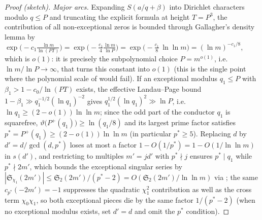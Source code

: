 \documentclass[11pt]{article}
\theoremstyle{plain}
\theoremstyle{definition}
\begin{document}
\begin{proof}[Proof (sketch)]
\emph{Major arcs.} Expanding $S(a/q + \beta)$ into Dirichlet
characters modulo $q \le P$ and truncating the explicit formula at
height $T = P^{3}$, the contribution of all non-exceptional zeros
is bounded through Gallagher's density lemma
\cite[Lemma~4.3]{mv} by
$\exp\bigl(-c_1 \frac{\ln m}{\ln(P T)}\bigr)
= \exp\bigl(-\frac{c_1}{4}\frac{\ln m}{\ln P}\bigr)
= \exp\bigl(-\frac{c_1}{8}\,\ln\ln m\bigr)
= (\ln m)^{-c_1/8}$,
which is $o(1)$: it is precisely the subpolynomial choice
$P = m^{o(1)}$, i.e.\ $\ln m/\ln P \to \infty$, that turns this
constant into $o(1)$ (this is the single point where the
polynomial scale of \cite{mv} would fail). If an exceptional modulus
$q_1 \le P$ with $\beta_1 > 1 - c_0/\ln(PT)$ exists, the effective
Landau--Page bound $1 - \beta_1 \gg q_1^{-1/2}(\ln q_1)^{-2}$
gives $q_1^{1/2}(\ln q_1)^{2} \gg \ln P$, i.e.\
$\ln q_1 \ge (2 - o(1))\ln\ln m$; since the odd part of the
conductor $q_1$ is squarefree, $\vartheta\bigl(P^{+}(q_1)\bigr)
\ge \ln(q_1/8)$ and its largest prime factor satisfies
$p^{\ast} = P^{+}(q_1) \ge (2 - o(1))\ln\ln m$ (in particular
$p^{\ast} \ge 5$). Replacing $d$ by $d' = d/\gcd(d, p^{\ast})$
loses at most a factor $1 - O(1/p^{\ast}) = 1 - O(1/\ln\ln m)$ in
$s(d')$, and restricting to multiples $m' = j d'$ with
$p^{\ast} \nmid j$ ensures $p^{\ast} \mid q_1$ while
$p^{\ast} \nmid 2m'$, which bounds the exceptional singular series
by $|\mathfrak{S}_{\chi_1}(2m')| \le \mathfrak{S}_2(2m')/(p^{\ast}-2)
= O(\mathfrak{S}_2(2m')/\ln\ln m)$ via \cite[Lemma~5.2]{mv}; the
same $c_{p^{\ast}}(-2m') = -1$ suppresses the quadratic
$\chi_1^{2}$ contribution as well as the cross term
$\chi_0\chi_1$, so both exceptional pieces die by the same
factor $1/(p^{\ast} - 2)$ (when no
exceptional modulus exists, set $d' = d$ and omit the $p^{\ast}$
condition).


\end{proof}
\end{document}

